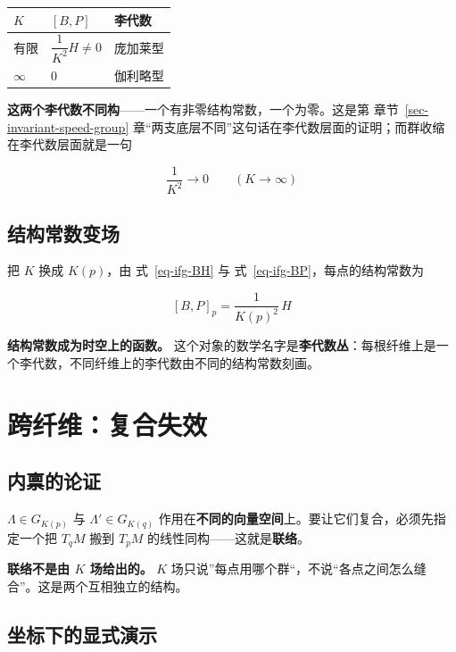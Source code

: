 \documentclass[
  chinese,
  a4paper,
  UTF8,
  12pt,
  oneside,
  openany]{ctexbook}
\newcounter{none} %
\theoremstyle{plain}
\theoremstyle{plain}
\theoremstyle{plain}
\theoremstyle{definition}
\theoremstyle{plain}
\theoremstyle{plain}
\theoremstyle{remark}
\begin{document}
{\def\LTcaptype{none} %
\begin{longtable}[]{@{}lll@{}}
\toprule\noalign{}
\(K\) & \([B,P]\) & 李代数 \\
\midrule\noalign{}
\endhead
\bottomrule\noalign{}
\endlastfoot
有限 & \(\dfrac{1}{K^{2}}H\neq0\) & 庞加莱型 \\
\(\infty\) & \(0\) & 伽利略型 \\
\end{longtable}
}

\textbf{这两个李代数不同构}------一个有非零结构常数，一个为零。这是第
章节~\ref{sec-invariant-speed-group}
章``两支底层不同''这句话在李代数层面的证明；而群收缩在李代数层面就是一句

\[
\frac{1}{K^{2}}\longrightarrow 0\qquad (K\to\infty)
\]

\subsection{结构常数变场}\label{ux7ed3ux6784ux5e38ux6570ux53d8ux573a}

把 \(K\) 换成 \(K(p)\)，由 式~\ref{eq-ifg-BH} 与
式~\ref{eq-ifg-BP}，每点的结构常数为

\[
[B,P]_{p}=\frac{1}{K(p)^{2}}\,H
\]

\textbf{结构常数成为时空上的函数。}
这个对象的数学名字是\textbf{李代数丛}：每根纤维上是一个李代数，不同纤维上的李代数由不同的结构常数刻画。

\section{跨纤维：复合失效}\label{sec-ifg-cross}

\subsection{内禀的论证}\label{ux5185ux7980ux7684ux8bbaux8bc1}

\(\Lambda\in G_{K(p)}\) 与 \(\Lambda'\in G_{K(q)}\)
作用在\textbf{不同的向量空间}上。要让它们复合，必须先指定一个把 \(T_qM\)
搬到 \(T_pM\) 的线性同构------这就是\textbf{联络}。

\textbf{联络不是由 \(K\) 场给出的。} \(K\)
场只说''每点用哪个群``，不说``各点之间怎么缝合''。这是两个互相独立的结构。

\subsection{坐标下的显式演示}\label{ux5750ux6807ux4e0bux7684ux663eux5f0fux6f14ux793a}
\end{document}
